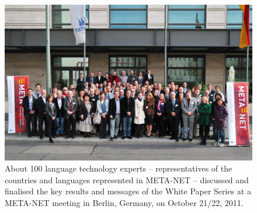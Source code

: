\documentclass[10pt, plain]{../../metanetpaper}
\begin{document}
\renewcommand*{\figureformat}{}
\renewcommand*{\captionformat}{}

\begin{figure}[h]
  \center
  \includegraphics[width=\textwidth]{../_media/meta-net_team.jpg}
  \caption{About 100 language technology experts -- representatives of the countries and languages represented in META-NET -- discussed and finalised the key results and messages of the White Paper Series at a META-NET meeting in Berlin, Germany, on October 21/22, 2011.}
  \medskip
\end{figure}

\clearpage


\label{metamembers}


\clearpage


\label{vision-evolution}


\clearpage

\end{document}
